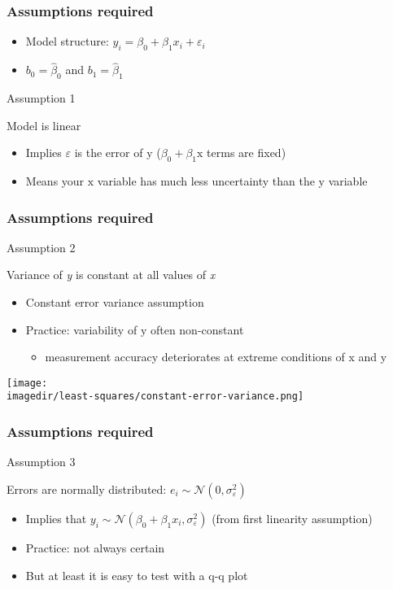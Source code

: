 \begin{frame}\frametitle{Assumptions required}
	\begin{itemize}
		\item	Model structure: $y_i = \beta_0 + \beta_1 x_i + \varepsilon_i$
		\item	$b_0 = \hat{\beta}_0$ and $b_1= \hat{\beta}_1$
	\end{itemize}
	\begin{block}{Assumption 1}
		\begin{center}
			Model is linear
		\end{center}
	\end{block}
	\begin{itemize}
		\item	Implies $\varepsilon$ is the error of $\mathrm{y}$ ($\beta_0 + \beta_1 \mathrm{x}$ terms are fixed)
		\item	Means your $\mathrm{x}$ variable has much less uncertainty than the $\mathrm{y}$ variable
	\end{itemize}
\end{frame}

\begin{frame}\frametitle{Assumptions required}
	\begin{block}{Assumption 2}
		\begin{center}
			Variance of \emph{y} is constant at all values of \emph{x}
		\end{center}
	\end{block}
	\begin{itemize}
		\item	Constant error variance assumption
		\item	Practice: variability of $\mathrm{y}$ often non-constant
		\begin{itemize}
			\item	measurement accuracy deteriorates at extreme conditions of x and y
		\end{itemize}
	\end{itemize}
	\begin{center}
		\texttt{[image: \\imagedir/least-squares/constant-error-variance.png]}
	\end{center}
\end{frame}

\begin{frame}\frametitle{Assumptions required}
	\begin{block}{Assumption 3}
		\begin{center}
			Errors are normally distributed: $e_i \sim \mathcal{N}(0, \sigma_\varepsilon^2)$
		\end{center}
	\end{block}
	\begin{itemize}
		\item	Implies that $y_i \sim \mathcal{N}(\beta_0 + \beta_1x_i, \sigma_\varepsilon^2)$ (from first linearity assumption)
		\item	Practice: not always certain
		\item	But at least it is easy to test with a q-q plot
	\end{itemize}
\end{frame}

